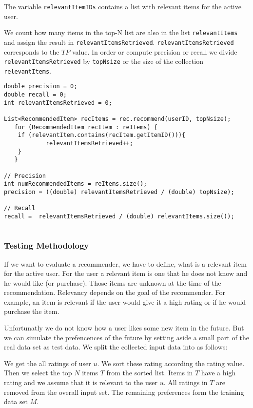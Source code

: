 The variable \verb|relevantItemIDs| contains a list with relevant items for the active user.

We count how many items in the top-N list are also in the list \verb|relevantItems| and assign the result in \verb|relevantItemsRetrieved|. \verb|relevantItemsRetrieved| corresponds to the $TP$ value. In order or compute precision or recall we divide \verb|relevantItemsRetrieved| by \verb|topNsize| or the size of the collection\\ \verb|relevantItems|.

\begin{lstlisting}[caption=Implementation of precision and recall,label=lst:irstats]
double precision = 0;
double recall = 0;
int relevantItemsRetrieved = 0;

List<RecommendedItem> recItems = rec.recommend(userID, topNsize);
   for (RecommendedItem recItem : reItems) {
	if (relevantItem.contains(recItem.getItemID())){
			relevantItemsRetrieved++;
	}
   }

// Precision
int numRecommendedItems = reItems.size();
precision = ((double) relevantItemsRetrieved / (double) topNsize);
		      
// Recall
recall =  relevantItemsRetrieved / (double) relevantItems.size());
		      
\end{lstlisting}


\subsubsection{Testing Methodology}
\label{sec:relevant}

If we want to evaluate a recommender, we have to define, what is a relevant item for the active user. For the user a relevant item is one that he does not know and he would like (or purchase). Those items are unknown at the time of the recommendation. Relevancy depends on the goal of the recommender. For example, an item is relevant if the user would give it a high rating or if he would purchase the item.

Unfortunatly we do not know how a user likes some new item in the future.
But we can simulate the prefencences of the future by setting aside a small part of the real data set as test data. We split the collected input data into as follows:


We get the all ratings of user $u$. We sort these rating according the rating value. Then we select the top $N$ items $T$ from the sorted list. Items in $T$ have a high rating and we assume that it is relevant to the user $u$.
All ratings in $T$ are removed from the overall input set. The remaining preferences form the training data set $M$. 

